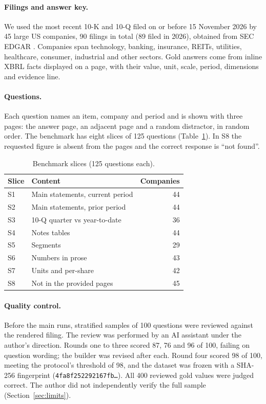 \documentclass[11pt]{article}
\begin{document}
\paragraph{Filings and answer key.} We used the most recent 10-K and 10-Q filed on or before 15 November 2026 by 45 large US companies, 90 filings in total (89 filed in 2026), obtained from SEC EDGAR \citep{sec_edgar}. Companies span technology, banking, insurance, REITs, utilities, healthcare, consumer, industrial and other sectors. Gold answers come from inline XBRL facts displayed on a page, with their value, unit, scale, period, dimensions and evidence line.

\paragraph{Questions.} Each question names an item, company and period and is shown with three pages: the answer page, an adjacent page and a random distractor, in random order. The benchmark has eight slices of 125 questions (Table~\ref{tab:slices}). In S8 the requested figure is absent from the pages and the correct response is ``not found''.

\begin{table}[!htbp]\centering\small
\caption{Benchmark slices (125 questions each).}\label{tab:slices}
\begin{tabular}{llr}\toprule
Slice & Content & Companies\\\midrule
S1 & Main statements, current period & 44\\
S2 & Main statements, prior period & 44\\
S3 & 10-Q quarter vs year-to-date & 36\\
S4 & Notes tables & 44\\
S5 & Segments & 29\\
S6 & Numbers in prose & 43\\
S7 & Units and per-share & 42\\
S8 & Not in the provided pages & 45\\
\bottomrule\end{tabular}
\end{table}

\paragraph{Quality control.} Before the main runs, stratified samples of 100 questions were reviewed against the rendered filing. The review was performed by an AI assistant under the author's direction. Rounds one to three scored 87, 76 and 96 of 100, failing on question wording; the builder was revised after each. Round four scored 98 of 100, meeting the protocol's threshold of 98, and the dataset was frozen with a SHA-256 fingerprint (\texttt{4fa8f252292167fb\ldots}). All 400 reviewed gold values were judged correct. The author did not independently verify the full sample (Section~\ref{sec:limits}).
\end{document}
